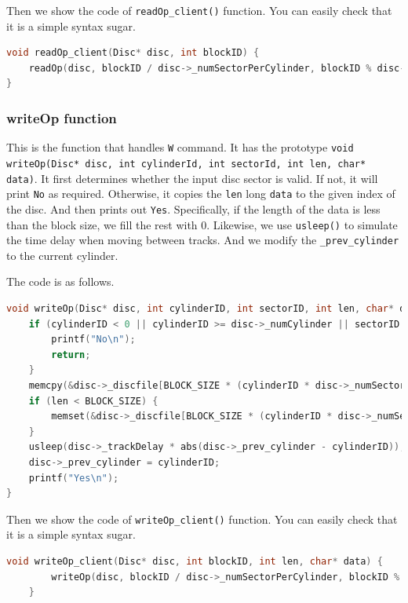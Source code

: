 Then we show the code of \texttt{readOp\_client()} function. You can easily check that it is a simple syntax sugar.

\begin{lstlisting}[language=C]
void readOp_client(Disc* disc, int blockID) {
    readOp(disc, blockID / disc->_numSectorPerCylinder, blockID % disc->_numSectorPerCylinder);
}
\end{lstlisting}

\subsubsection{writeOp function}
This is the function that handles \texttt{W} command. It has the prototype \texttt{void writeOp(Disc* disc, int cylinderId, int sectorId, int len, char* data)}.
It first determines whether the input disc sector is valid. If not, it will print \texttt{No} as required.
Otherwise, it copies the \texttt{len} long \texttt{data} to the given index of the disc. And then prints out \texttt{Yes}.
Specifically, if the length of the data is less than the block size, we fill the rest with 0.
Likewise, we use \texttt{usleep()} to simulate the time delay when moving between tracks. And we modify the \texttt{_prev_cylinder} to the current cylinder.

The code is as follows.

\begin{lstlisting}[language=C]
void writeOp(Disc* disc, int cylinderID, int sectorID, int len, char* data) {
    if (cylinderID < 0 || cylinderID >= disc->_numCylinder || sectorID < 0 || sectorID >= disc->_numSectorPerCylinder || len < 0 || len > BLOCK_SIZE) {
        printf("No\n");
        return;
    }
    memcpy(&disc->_discfile[BLOCK_SIZE * (cylinderID * disc->_numSectorPerCylinder + sectorID)], data, len);
    if (len < BLOCK_SIZE) {
        memset(&disc->_discfile[BLOCK_SIZE * (cylinderID * disc->_numSectorPerCylinder + sectorID) + len], 0, BLOCK_SIZE - len);
    }
    usleep(disc->_trackDelay * abs(disc->_prev_cylinder - cylinderID));
    disc->_prev_cylinder = cylinderID;
    printf("Yes\n");
}
\end{lstlisting}

Then we show the code of \texttt{writeOp\_client()} function. You can easily check that it is a simple syntax sugar.

\begin{lstlisting}[language=C]
    void writeOp_client(Disc* disc, int blockID, int len, char* data) {
        writeOp(disc, blockID / disc->_numSectorPerCylinder, blockID % disc->_numSectorPerCylinder, len, data);
    }
\end{lstlisting}

